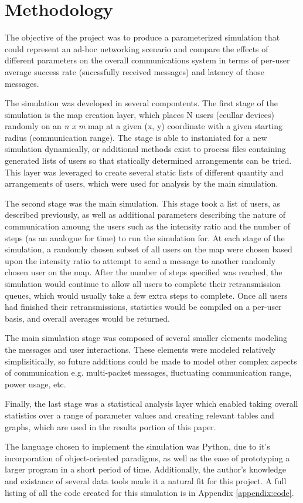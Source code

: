 \section{Methodology}
The objective of the project was to produce a parameterized simulation 
that could represent an ad-hoc networking scenario and compare the effects 
of different parameters on the overall communications system in terms of 
per-user average success rate (succssfully received messages) 
and latency of those messages.

The simulation was developed in several compontents.
The first stage of the simulation is the map creation layer,
which places N users (ceullar devices) randomly on an \textit{n x m} map at a
given (x, y) coordinate with a given starting radius (communication range).
The stage is able to instaniated for a new simulation dynamically, or additional
methods exist to process files containing generated lists of users so that
statically determined arrangements can be tried.
This layer was leveraged to create several static lists of different quantity
and arrangements of users, which were used for analysis by the main simulation.

The second stage was the main simulation.
This stage took a list of users, as described previously, as well as additional
parameters describing the nature of communication amoung the users such as
the intensity ratio and the number of steps (as an analogue for time) to run 
the simulation for.
At each stage of the simulation, a randomly chosen subset of all users on the map
were chosen based upon the intensity ratio to attempt to send a message to another
randomly chosen user on the map.
After the number of steps specified was reached, the simulation would continue
to allow all users to complete their retransmission queues, which would usually
take a few extra steps to complete.
Once all users had finished their retransmissions, statistics would be compiled
on a per-user basis, and overall averages would be returned.

The main simulation stage was composed of several smaller elements modeling
the messages and user interactions.
These elements were modeled relatively simplisitically, so future additions could be
made to model other complex aspects of communication e.g. multi-packet messages,
fluctuating communication range, power usage, etc.

Finally, the last stage was a statistical analysis layer which enabled taking overall
statistics over a range of parameter values and creating relevant tables and graphs,
which are used in the results portion of this paper.

The language chosen to implement the simulation was Python, due to it's incorporation of 
object-oriented paradigms, as well as the ease of prototyping a larger program in a 
short period of time.
Additionally, the author's knowledge and existance of several data tools made it a natural
fit for this project.
A full listing of all the code created for this simulation is in Appendix \ref{appendix:code}.
